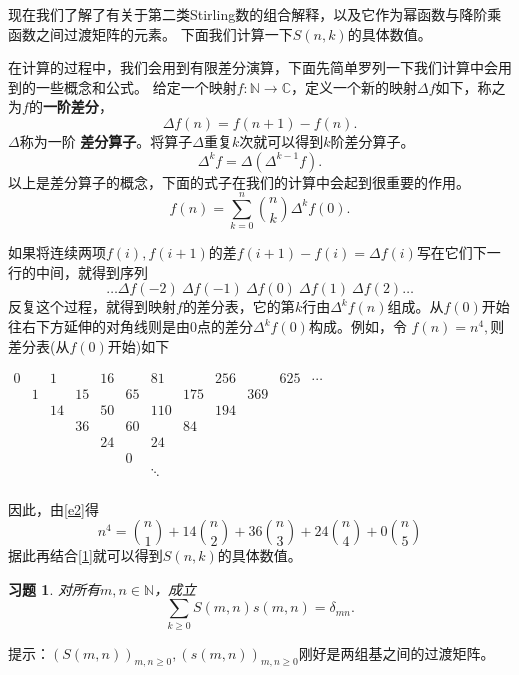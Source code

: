 \documentclass[a4paper,11pt,twoside]{book}
\newtheorem{ex}[thm]{习题}
\begin{document}
现在我们了解了有关于第二类Stirling数的组合解释，以及它作为幂函数与降阶乘函数之间过渡矩阵的元素。
下面我们计算一下$S(n,k)$的具体数值。

在计算的过程中，我们会用到有限差分演算，下面先简单罗列一下我们计算中会用到的一些概念和公式。
给定一个映射$f:\mathbb{N}\rightarrow\mathbb{C}$，定义一个新的映射$\Delta
f$如下，称之为$f$的{\bf 一阶差分}，
$$\Delta f(n)=f(n+1)-f(n).$$
$\Delta$称为一阶{\bf
差分算子}。将算子$\Delta$重复$k$次就可以得到$k$阶差分算子。
$$\Delta^k f=\Delta(\Delta^{k-1}f).$$
以上是差分算子的概念，下面的式子在我们的计算中会起到很重要的作用。
\begin{equation}
f(n)=\sum_{k=0}^n{n\choose k}\Delta^k f(0).\label{e2}
\end{equation}

如果将连续两项$f(i),f(i+1)$的差$f(i+1)-f(i)=\Delta
f(i)$写在它们下一行的中间，就得到序列
$$\ldots \Delta f(-2)\ \Delta f(-1)\ \Delta f(0)\ \Delta f(1)\ \Delta f(2)\ldots$$
反复这个过程，就得到映射$f$的差分表，它的第$k$行由$\Delta^k
f(n)$组成。从$f(0)$开始往右下方延伸的对角线则是由0点的差分$\Delta^k
f(0)$构成。例如，令 $f(n)=n^4,$则差分表(从$f(0)$开始)如下


$\begin{array}{cccccccccccc}
  0 &  & 1 &  & 16 &  & 81 &  & 256 &  & 625 & \cdots \\
   & 1 &  & 15 &  & 65 &  & 175 &  & 369 &  &  \\
   &  & 14 &  & 50 &  & 110 &  & 194 &  &  &  \\
   &  &  & 36 &  & 60 &  & 84 &  &  &  &  \\
   &  &  &  & 24 &  & 24 &  &  &  &  &  \\
   &  &  &  &  & 0 &  &  &  &  &  &  \\
   &  &  &  &  &  & \ddots &  &  &  &  &  \\
   &  &  &  &  &  &  &  &  &  &  &
\end{array}$

因此，由\ref{e2}得
$$n^4={n\choose 1}+14{n\choose 2}+36{n\choose 3}+24{n\choose 4}+0{n\choose 5}$$
据此再结合\ref{1}就可以得到$S(n,k)$的具体数值。

\begin{ex} 对所有$m,n\in\mathbb{N}$，成立
$$\sum_{k\geq 0}S(m,n)s(m,n)=\delta_{mn}.$$
\end{ex}

提示：$\left(S(m,n)\right)_{m,n\geq 0},\left(s(m,n)\right)_{m,n\geq
0}$刚好是两组基之间的过渡矩阵。

\end{document}
